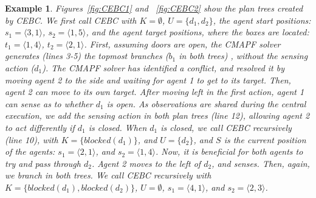 \documentclass[letterpaper]{article} %
\newtheorem{exmp}{Example}
\begin{document}
\begin{exmp}
Figures~\ref{fig:CEBC1} and ~\ref{fig:CEBC2} show the plan trees created by CEBC. We first call CEBC with $K=\emptyset$, $U=\{d_1,d_2\}$,  the agent start positions: $s_1=\langle 3,1 \rangle$, $s_2=\langle 1,5 \rangle$, and the agent target positions, where the boxes are located: $t_1=\langle 1,4 \rangle$, $t_2=\langle 2,1 \rangle$.
First, assuming doors are open, the CMAPF solver generates (lines 3-5) the topmost branches ($b_1$ in both trees) , without the sensing action ($d_1$). The CMAPF solver has identified a conflict, and resolved it by moving agent 2 to the side and waiting for agent 1 to get to its target. Then, agent 2 can move to its own target.
After moving left in the first action, agent 1 can sense as to whether $d_1$ is open. As observations are shared during the central execution, we add the sensing action in both plan trees (line 12), allowing agent 2 to act differently if $d_1$ is closed. When $d_1$ is closed, we call CEBC recursively (line 10), with $K=\{blocked(d_1)\}$, and $U=\{d_2\}$, and $S$ is the current position of the agents: $s_1=\langle 2,1 \rangle$, and $s_2=\langle 1,4 \rangle$. Now, it is beneficial for both agents to try and pass through $d_2$. Agent 2 moves to the left of $d_2$, and senses. Then, again, we branch in both trees. We call CEBC recursively with $K=\{blocked(d_1),blocked(d_2)\}$, $U=\emptyset$, $s_1=\langle 4,1 \rangle$, and $s_2=\langle 2,3 \rangle$.
\end{exmp}
\end{document}
